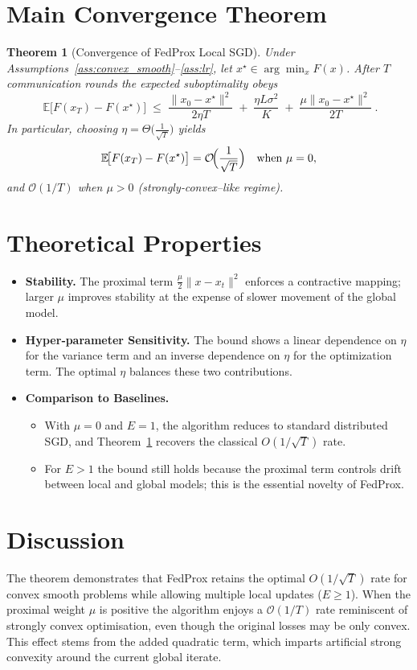 \documentclass{article}
\newtheorem{theorem}{Theorem}
\newcommand{\E}{\mathbb{E}}
\begin{document}
\section*{Main Convergence Theorem}
\begin{theorem}[Convergence of FedProx Local SGD]\label{thm:main}
Under Assumptions~\ref{ass:convex_smooth}--\ref{ass:lr},
let $x^{\star}\in\arg\min_{x}F(x)$.
After $T$ communication rounds the expected suboptimality obeys
\[
\boxed{\;
\E\!\bigl[F(x_T)-F(x^{\star})\bigr]
\;\le\;
\frac{\|x_0-x^{\star}\|^{2}}{2\eta T}
\;+\;
\frac{\eta L\sigma^{2}}{K}\;+\;
\frac{\mu\|x_0-x^{\star}\|^{2}}{2T}\; }.
\]
In particular, choosing $\eta=\Theta\!\bigl(\frac{1}{\sqrt{T}}\bigr)$ yields
\[
\E\!\bigl[F(x_T)-F(x^{\star})\bigr]=
\mathcal{O}\!\Bigl(\frac{1}{\sqrt{T}}\Bigr)
\quad\text{when }\mu=0,
\]
and $\mathcal{O}(1/T)$ when $\mu>0$ (strongly‑convex–like regime).
\end{theorem}

\section*{Theoretical Properties}
\begin{itemize}
\item \textbf{Stability.} The proximal term $\frac{\mu}{2}\|x-x_t\|^{2}$ enforces
a contractive mapping; larger $\mu$ improves stability at the expense of slower
movement of the global model.
\item \textbf{Hyper‑parameter Sensitivity.} The bound shows a linear dependence on
$\eta$ for the variance term and an inverse dependence on $\eta$ for the
optimization term. The optimal $\eta$ balances these two contributions.
\item \textbf{Comparison to Baselines.}
\begin{itemize}
\item With $\mu=0$ and $E=1$, the algorithm reduces to standard distributed SGD,
and Theorem~\ref{thm:main} recovers the classical $O(1/\sqrt{T})$ rate.
\item For $E>1$ the bound still holds because the proximal term controls drift
between local and global models; this is the essential novelty of FedProx.
\end{itemize}
\end{itemize}

\section*{Discussion}
The theorem demonstrates that FedProx retains the optimal $O(1/\sqrt{T})$ rate
for convex smooth problems while allowing multiple local updates ($E\ge1$).
When the proximal weight $\mu$ is positive the algorithm enjoys a
$\mathcal{O}(1/T)$ rate reminiscent of strongly convex optimisation, even though the
original losses may be only convex. This effect stems from the added quadratic term,
which imparts artificial strong convexity around the current global iterate.
\end{document}
